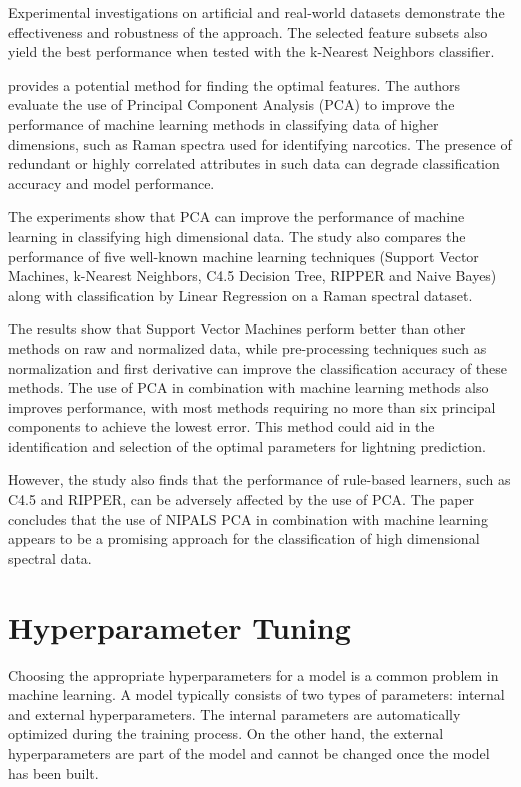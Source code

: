 Experimental investigations on artificial and real-world datasets demonstrate the effectiveness and robustness of the approach. The selected feature subsets also yield the best performance when tested with the k-Nearest Neighbors classifier.

\textcite{pca-performance} provides a potential method for finding the optimal features. The authors evaluate the use of Principal Component Analysis (PCA) to improve the performance of machine learning methods in classifying data of higher dimensions, such as Raman spectra used for identifying narcotics. The presence of redundant or highly correlated attributes in such data can degrade classification accuracy and model performance. 

The experiments show that PCA can improve the performance of machine learning in classifying high dimensional data. The study also compares the performance of five well-known machine learning techniques (Support Vector Machines, k-Nearest Neighbors, C4.5 Decision Tree, RIPPER and Naive Bayes) along with classification by Linear Regression on a Raman spectral dataset. 

The results show that Support Vector Machines perform better than other methods on raw and normalized data, while pre-processing techniques such as normalization and first derivative can improve the classification accuracy of these methods. The use of PCA in combination with machine learning methods also improves performance, with most methods requiring no more than six principal components to achieve the lowest error. This method could aid in the identification and selection of the optimal parameters for lightning prediction.

However, the study also finds that the performance of rule-based learners, such as C4.5 and RIPPER, can be adversely affected by the use of PCA. The paper concludes that the use of NIPALS PCA in combination with machine learning appears to be a promising approach for the classification of high dimensional spectral data.

\section{Hyperparameter Tuning}

Choosing the appropriate hyperparameters for a model is a common problem in machine learning. A model typically consists of two types of parameters: internal and external hyperparameters. The internal parameters are automatically optimized during the training process. On the other hand, the external hyperparameters are part of the model and cannot be changed once the model has been built.

